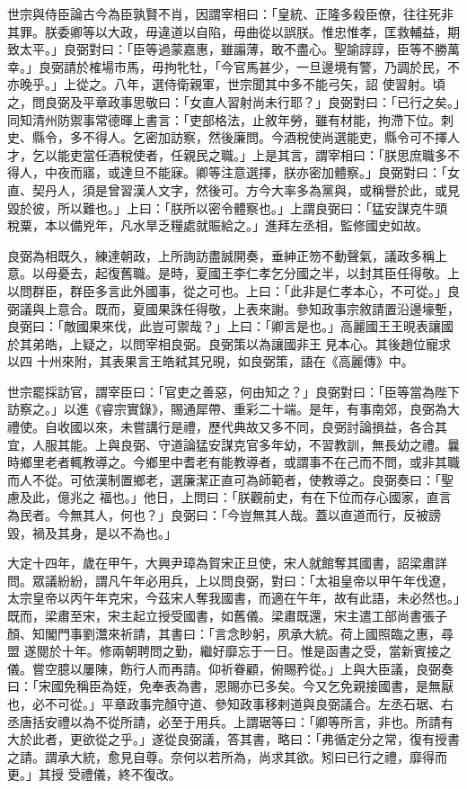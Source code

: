 \begin{pinyinscope}
 世宗與侍臣論古今為臣孰賢不肖，因謂宰相曰：「皇統、正隆多殺臣僚，往往死非其罪。朕委卿等以大政，毋違道以自陷，毋曲從以誤朕。惟忠惟孝，匡救輔益，期致太平。」良弼對曰：「臣等過蒙嘉惠，雖譾薄，敢不盡心。聖諭諄諄，臣等不勝萬幸。」良弼請於榷場市馬，毋拘牝牡，「今官馬甚少，一旦邊境有警，乃調於民，不亦晚乎。」上從之。八年，選侍衛親軍，世宗聞其中多不能弓矢，詔
 使習射。頃之，問良弼及平章政事思敬曰：「女直人習射尚未行耶？」良弼對曰：「已行之矣。」同知清州防禦事常德暉上書言：「吏部格法，止敘年勞，雖有材能，拘滯下位。刺史、縣令，多不得人。乞密加訪察，然後廉問。今酒稅使尚選能吏，縣令可不擇人才，乞以能吏當任酒稅使者，任親民之職。」上是其言，謂宰相曰：「朕思庶職多不得人，中夜而寤，或達旦不能寐。卿等注意選擇，朕亦密加體察。」良弼對曰：「女直、契丹人，須是曾習漢人文字，然後可。方今大率多為黨與，或稱譽於此，或見毀於彼，所以難也。」上曰：「朕所以密令體察也。」上謂良弼曰：「猛安謀克牛頭
 稅粟，本以備兇年，凡水旱乏糧處就賑給之。」進拜左丞相，監修國史如故。



 良弼為相既久，練達朝政，上所詢訪盡誠開奏，垂紳正笏不動聲氣，議政多稱上意。以母憂去，起復舊職。是時，夏國王李仁孝乞分國之半，以封其臣任得敬。上以問群臣，群臣多言此外國事，從之可也。上曰：「此非是仁孝本心，不可從。」良弼議與上意合。既而，夏國果誅任得敬，上表來謝。參知政事宗敘請置沿邊壕塹，良弼曰：「敵國果來伐，此豈可禦哉？」上曰：「卿言是也。」高麗國王王晛表讓國於其弟皓，上疑之，以問宰相良弼。良弼策以為讓國非王見本心。其後趙位寵求以四
 十州來附，其表果言王皓弒其兄晛，如良弼策，語在《高麗傳》中。



 世宗罷採訪官，謂宰臣曰：「官吏之善惡，何由知之？」良弼對曰：「臣等當為陛下訪察之。」以進《睿宗實錄》，賜通犀帶、重彩二十端。是年，有事南郊，良弼為大禮使。自收國以來，未嘗講行是禮，歷代典故又多不同，良弼討論損益，各合其宜，人服其能。上與良弼、守道論猛安謀克官多年幼，不習教訓，無長幼之禮。曩時鄉里老者輒教導之。今鄉里中耆老有能教導者，或謂事不在己而不問，或非其職而人不從。可依漢制置鄉老，選廉潔正直可為師範者，使教導之。良弼奏曰：「聖慮及此，億兆之
 福也。」他日，上問曰：「朕觀前史，有在下位而存心國家，直言為民者。今無其人，何也？」良弼曰：「今豈無其人哉。蓋以直道而行，反被謗毀，禍及其身，是以不為也。」



 大定十四年，歲在甲午，大興尹璋為賀宋正旦使，宋人就館奪其國書，詔梁肅詳問。眾議紛紛，謂凡午年必用兵，上以問良弼，對曰：「太祖皇帝以甲午年伐遼，太宗皇帝以丙午年克宋，今茲宋人奪我國書，而適在午年，故有此語，未必然也。」既而，梁肅至宋，宋主起立授受國書，如舊儀。梁肅既還，宋主遣工部尚書張子顏、知閣門事劉灊來祈請，其書曰：「言念眇躬，夙承大統。荷上國照臨之惠，尋盟
 遂閱於十年。修兩朝聘問之勤，繼好靡忘于一日。惟是函書之受，當新賓接之儀。嘗空臆以屢陳，飭行人而再請。仰祈眷顧，俯賜矜從。」上與大臣議，良弼奏曰：「宋國免稱臣為姪，免奉表為書，恩賜亦已多矣。今又乞免親接國書，是無厭也，必不可從。」平章政事完顏守道、參知政事移剌道與良弼議合。左丞石琚、右丞唐括安禮以為不從所請，必至于用兵。上謂琚等曰：「卿等所言，非也。所請有大於此者，更欲從之乎。」遂從良弼議，答其書，略曰：「弗循定分之常，復有授書之請。謂承大統，愈見自尊。奈何以若所為，尚求其欲。矧曰已行之禮，靡得而更。」其授
 受禮儀，終不復改。




\end{pinyinscope}

